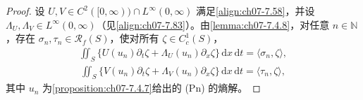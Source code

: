 \documentclass[../../main.tex]{subfiles}%
\begin{document}
\begin{proof}
设 $U,V\in C^2([0,\infty))\cap L^\infty(0,\infty)$ 满足\eqref{align:ch07-7.58}，并设 $\Lambda_U,\Lambda_V\in L^\infty(0,\infty)$（见\eqref{align:ch07-7.83}）。由\cref{lemma:ch07-7.4.8}，对任意 $n\in\mathbb{N}$，存在 $\sigma_n,\tau_n\in\mathscr{R}_f(S)$，使对所有 $\zeta\in C^1_c(S)$，
\begin{align}
\iint_S\{U(u_n)\partial_t\zeta+\Lambda_U(u_n)\partial_x\zeta\}\,\mathrm{d}x\,\mathrm{d}t=\langle\sigma_n,\zeta\rangle, \label{align:ch07-7.120a}
\end{align}
\begin{align}
\iint_S\{V(u_n)\partial_t\zeta+\Lambda_V(u_n)\partial_x\zeta\}\,\mathrm{d}x\,\mathrm{d}t=\langle\tau_n,\zeta\rangle, \label{align:ch07-7.120b}
\end{align}
其中 $u_n$ 为\cref{proposition:ch07-7.4.7}给出的 (Pn) 的熵解。


\end{proof}
\end{document}
